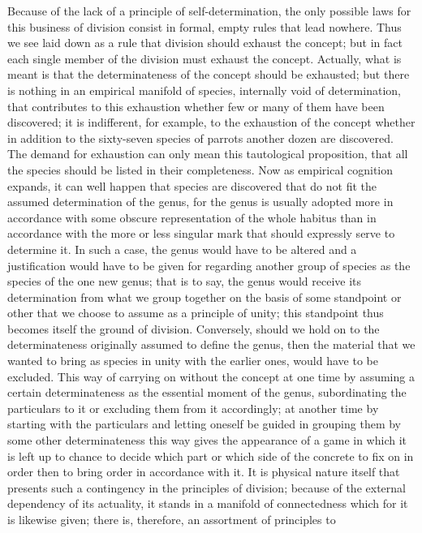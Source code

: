 Because of the lack of a principle of self-determination,
the only possible laws for this business of division
consist in formal, empty rules that lead nowhere.
Thus we see laid down as a rule that
division should exhaust the concept;
but in fact each single member of the division
must exhaust the concept.
Actually, what is meant is that
the determinateness of the concept
should be exhausted;
but there is nothing in an empirical manifold of species,
internally void of determination,
that contributes to this exhaustion
whether few or many of them have been discovered;
it is indifferent, for example,
to the exhaustion of the concept
whether in addition to
the sixty-seven species of parrots
another dozen are discovered.
The demand for exhaustion can only
mean this tautological proposition,
that all the species should be
listed in their completeness.
Now as empirical cognition expands,
it can well happen that species are
discovered that do not fit the
assumed determination of the genus,
for the genus is usually adopted more
in accordance with some obscure
representation of the whole habitus
than in accordance with the more or less
singular mark that should expressly
serve to determine it.
In such a case, the genus would have to be altered
and a justification would have to be given
for regarding another group of species as
the species of the one new genus;
that is to say, the genus would receive
its determination from what we group together
on the basis of some standpoint or other
that we choose to assume as a principle of unity;
this standpoint thus becomes itself the ground of division.
Conversely, should we hold on to the determinateness
originally assumed to define the genus,
then the material that we wanted to bring as
species in unity with the earlier ones,
would have to be excluded.
This way of carrying on without the concept
at one time by assuming a certain determinateness
as the essential moment of the genus,
subordinating the particulars to it
or excluding them from it accordingly;
at another time by starting with the particulars
and letting oneself be guided in grouping them
by some other determinateness
this way gives the appearance of a game
in which it is left up to chance to
decide which part or which side of
the concrete to fix on in order then to
bring order in accordance with it.
It is physical nature itself that presents
such a contingency in the principles of division;
because of the external dependency of its actuality,
it stands in a manifold of connectedness
which for it is likewise given;
there is, therefore, an assortment of principles to
